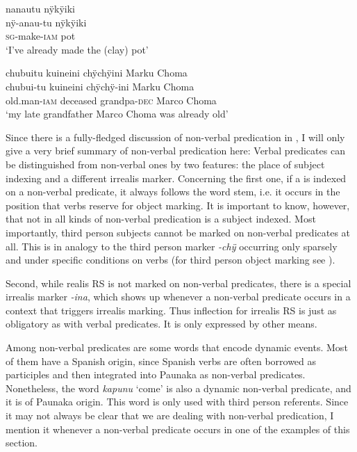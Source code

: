 \ea\label{ex:new23-iam-V}
\begingl
\glpreamble nanautu nÿkÿiki\\
\gla nÿ-anau-tu nÿkÿiki\\
\textsc{sg}-make-\textsc{iam} pot\\
\glft ‘I’ve already made the (clay) pot’
\endgl
\trailingcitation{[jxx-d110923l-1.03]}
\xe

\ea\label{ex:new23-iam-N}
\begingl
\glpreamble chubuitu kuineini chÿchÿini Marku Choma\\
\gla chubui-tu kuineini chÿchÿ-ini {Marku Choma}\\
\glb old.man-\textsc{iam} deceased grandpa-\textsc{dec} {Marco Choma}\\
\glft ‘my late grandfather Marco Choma was already old’
\endgl
\trailingcitation{[mxx-p110825l.023]}
\xe

Since there is a fully-fledged discussion of non-verbal predication in , I will only give a very brief summary of non-verbal predication here: Verbal predicates can be distinguished from non-verbal ones by two features: the place of subject indexing and a different irrealis marker. Concerning the first one, if a  is indexed on a non-verbal predicate, it always follows the word stem, i.e. it occurs in the position that verbs reserve for object marking. It is important to know, however, that not in all kinds of non-verbal predication is a subject indexed. Most importantly, third person subjects cannot be marked on non-verbal predicates at all. This is in analogy to the third person marker \textit{-chÿ} occurring only sparsely and under specific conditions on verbs (for third person object marking see ). 

Second, while realis RS is not marked on non-verbal predicates, there is a special irrealis marker \textit{-ina}, which shows up whenever a non-verbal predicate occurs in a context that triggers irrealis marking. Thus inflection for irrealis RS is just as obligatory as with verbal predicates. It is only expressed by other means.

Among non-verbal predicates are some words that encode dynamic events. Most of them have a Spanish origin, since Spanish verbs are often borrowed as participles and then integrated into Paunaka as non-verbal predicates. Nonetheless, the word \textit{kapunu} ‘come’ is also a dynamic non-verbal predicate, and it is of Paunaka origin. This word is only used with third person referents. Since it may not always be clear that we are dealing with non-verbal predication, I mention it whenever a non-verbal predicate occurs in one of the examples of this section.

